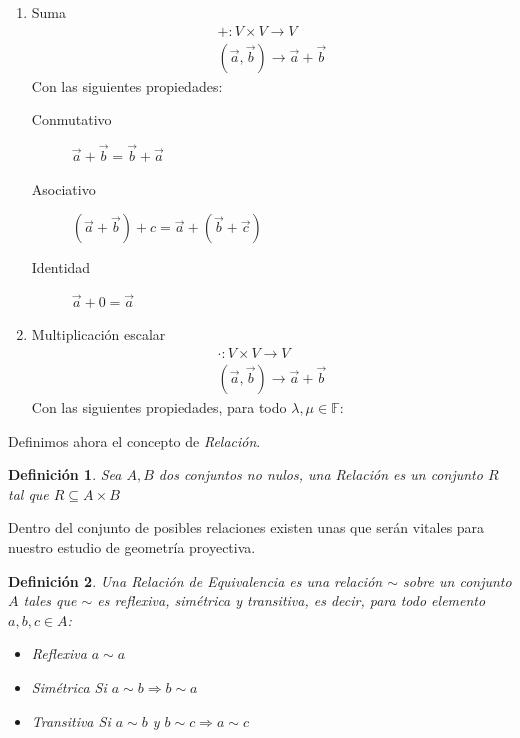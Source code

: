 \documentclass[10pt,a4paper]{article}
\newtheorem{mydef}{Definición}
\begin{document}
\begin{enumerate}
\item Suma
\begin{align*}
+: V \times V \longrightarrow V \\
(\vec{a},\vec{b}) \rightarrow \vec{a}+\vec{b}
\end{align*}
Con las siguientes propiedades:
\begin{description}
\item[Conmutativo] $\vec{a}+\vec{b}=\vec{b}+\vec{a}$
\item[Asociativo] $(\vec{a}+\vec{b})+c=\vec{a}+(\vec{b}+\vec{c})$ 
\item [Identidad] $\vec{a}+0=\vec{a}$ 
\end{description}
\item Multiplicación escalar
\begin{align*}
\cdot: V \times V \longrightarrow V \\
(\vec{a},\vec{b}) \rightarrow \vec{a}+\vec{b}
\end{align*}
Con las siguientes propiedades, para todo $ \lambda, \mu \in \mathbb{F}$: 
\end{enumerate}

Definimos ahora el concepto de \textit{Relación}.

\begin{mydef} Sea $ A, B $ dos conjuntos no nulos, una \textit{Relación} es un conjunto $R$ tal que $ R \subseteq A\times B$ 
\end{mydef}
Dentro del conjunto de  posibles relaciones existen unas que serán vitales para nuestro estudio de geometría proyectiva. 
\begin{mydef} Una \textit{Relación de Equivalencia} es una relación $\sim$ sobre un conjunto $A$ tales que $\sim$ es reflexiva, simétrica y transitiva, es decir, para todo elemento $a,b,c \in A$:
\begin{itemize}
\item Reflexiva $ a \sim a$
\item Simétrica Si $ a \sim b \Rightarrow b \sim a$
\item Transitiva Si $a \sim b$ y $ b \sim c \Rightarrow a \sim c $
\end{itemize}
\end{mydef}
 
\end{document}
